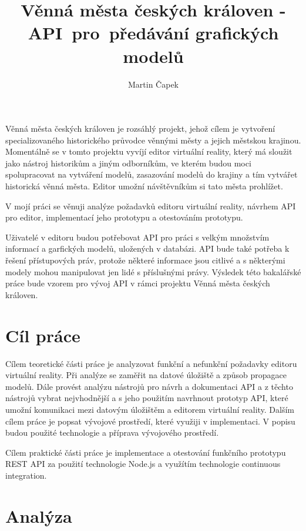 \documentclass[thesis=B,czech]{FITthesis}[2012/06/26]
\title{Věnná města českých královen - API~pro~předávání grafických modelů}
\author{Martin Čapek} %
\begin{document}

\begin{introduction}
	 Věnná města českých královen je rozsáhlý projekt, jehož cílem je vytvoření specializovaného historického průvodce věnnými městy a jejich městskou krajinou.
	 Momentálně se v tomto projektu vyvíjí editor virtuální reality, který má sloužit jako nástroj historikům a jiným odborníkům, ve kterém budou moci spolupracovat na vytváření modelů, zasazování modelů do krajiny a tím vytvářet historická věnná města. Editor umožní návštěvníkům si tato města prohlížet.

	 V mojí práci se věnuji analýze požadavků editoru virtuální reality, návrhem API pro editor, implementací jeho prototypu a otestováním prototypu.
	 
	 Uživatelé v editoru budou potřebovat API pro práci s velkým množstvím informací a garfických modelů, uložených v databázi. API bude také potřeba k řešení přístupových práv, protože některé informace jsou citlivé a s některými modely mohou manipulovat jen lidé s příslušnými právy. 
	 Výsledek této bakalářské práce bude vzorem pro vývoj API v rámci projektu Věnná města českých královen.
\end{introduction}

\chapter{Cíl práce}

    Cílem teoretické části práce je analyzovat funkční a nefunkční požadavky editoru virtuální reality. Při analýze se zaměřit na datové úložiště a způsob propagace modelů. Dále provést analýzu nástrojů pro návrh a dokumentaci API a z těchto nástrojů vybrat nejvhodnější a s jeho použitím navrhnout prototyp API, které umožní komunikaci mezi datovým úložištěm a editorem virtuální reality.
    Dalším cílem práce je popsat vývojové prostředí, které využiji v implementaci. V popisu budou použité technologie a příprava vývojového prostředí.
    
    Cílem praktické části práce je implementace a otestování funkčního prototypu REST API za použití technologie Node.js a využítím technologie continuous integration.


\chapter{Analýza}
\end{document}

